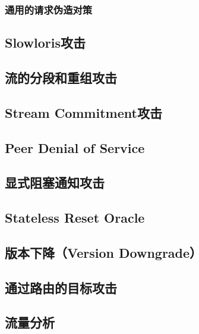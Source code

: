 \subsubsection{通用的请求伪造对策}

\subsection{Slowloris攻击}
\subsection{流的分段和重组攻击}
\subsection{Stream Commitment攻击}
\subsection{Peer Denial of Service}
\subsection{显式阻塞通知攻击}
\subsection{Stateless Reset Oracle}

\subsection{版本下降（Version Downgrade）}
\label{subsec:version-downgrade}

\subsection{通过路由的目标攻击}
\subsection{流量分析}